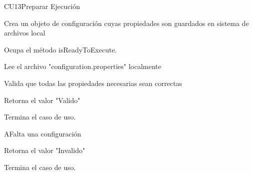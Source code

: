 	\begin{UseCase}{CU13}{Preparar Ejecución}{

		Crea un objeto de configuración cuyas propiedades son guardados en sistema de archivos local

	}















	\end{UseCase}


	\begin{UCtrayectoria}

		\UCpaso[\UCactor] Ocupa el método isReadyToExecute.

		\UCpaso[\UCsist] Lee el archivo "configuration.properties" localmente

		\UCpaso[\UCsist] Valida que todas las propiedades necesarias sean correctas 

		\UCpaso[\UCsist] Retorna el valor "Valido"

		\UCpaso[] Termina el caso de uso.

	\end{UCtrayectoria}




	\begin{UCtrayectoriaA}{A}{Falta una configuración}

		\UCpaso[\UCsist] Retorna el valor "Invalido"

		\UCpaso[] Termina el caso de uso.

	\end{UCtrayectoriaA}
